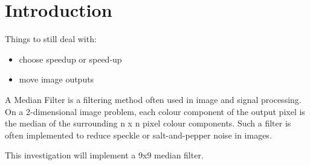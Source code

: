 \section{Introduction}
Things to still deal with:
\begin{itemize}
	\item choose speedup or speed-up
	\item move image outputs
\end{itemize}
A Median Filter is a filtering method often used in image and signal processing. On a 2-dimensional image problem, each colour component of the output pixel is the median of the surrounding n x n pixel colour components. Such a filter is often implemented to reduce speckle or salt-and-pepper noise in images\cite{NSP}.

This investigation will implement a 9x9 median filter.

